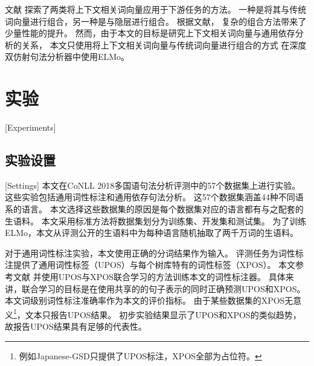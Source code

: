 文献
探索了两类将上下文相关词向量应用于下游任务的方法。
一种是将其与传统词向量进行组合，另一种是与隐层进行组合。
根据文献，
复杂的组合方法带来了少量性能的提升。
然而，由于本文的目标是研究上下文相关词向量与通用依存分析的关系，
本文只使用将上下文相关词向量与传统词向量进行组合的方式
在深度双仿射句法分析器中使用ELMo。

%
%

\section{实验}[Experiments]

\subsection{实验设置}[Settings]
本文在CoNLL 2018多国语句法分析评测\cite{udst:overview}中的57个数据集上进行实验。
这些实验包括通用词性标注和通用依存句法分析。
这57个数据集涵盖44种不同语系的语言。
本文选择这些数据集的原因是每个数据集对应的语言都有与之配套的生语料。
本文采用标准方法将数据集划分为训练集、开发集和测试集。
为了训练ELMo，本文从评测公开的生语料中为每种语言随机抽取了两千万词的生语料。

对于通用词性标注实验，本文使用正确的分词结果作为输入。
评测任务为词性标注提供了通用词性标签（UPOS）与每个树库特有的词性标签（XPOS）。
本文参考文献
并使用UPOS与XPOS联合学习的方法训练本文的词性标注器。
具体来讲，联合学习的目标是在使用共享的的句子表示的同时正确预测UPOS和XPOS。
本文词级别词性标注准确率作为本文的评价指标。
由于某些数据集的XPOS无意义\footnote{例如Japanese-GSD只提供了UPOS标注，XPOS全部为占位符。}，文本只报告UPOS结果。
初步实验结果显示了UPOS和XPOS的类似趋势，故报告UPOS结果具有足够的代表性。

